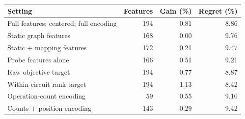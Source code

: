 \begin{tabular}{@{}lrrr@{}}
\toprule
\textbf{Setting} & \textbf{Features} & \textbf{Gain (\%)} & \textbf{Regret (\%)} \\
\midrule
Full features; centered; full encoding & 194 & 0.81 & 8.86 \\
Static graph features & 168 & 0.00 & 9.76 \\
Static + mapping features & 172 & 0.21 & 9.47 \\
Probe features alone & 166 & 0.51 & 9.21 \\
Raw objective target & 194 & 0.77 & 8.87 \\
Within-circuit rank target & 194 & 1.13 & 8.42 \\
Operation-count encoding & 59 & 0.55 & 9.10 \\
Counts + position encoding & 143 & 0.29 & 9.42 \\
\bottomrule
\end{tabular}
